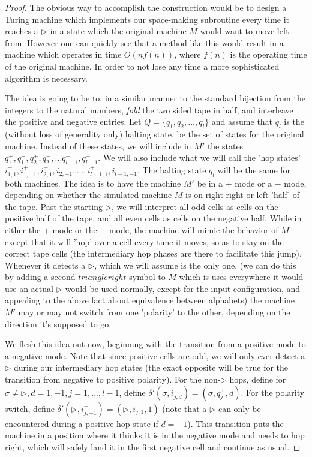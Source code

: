 \documentclass{article}
\theoremstyle{definition}
\theoremstyle{plain}
\theoremstyle{theorem}
\begin{document}
\begin{proof}
	The obvious way to accomplish the construction would be to design a Turing machine which implements our space-making subroutine every time it reaches a $\triangleright$ in a state which the original machine $M$ would want to move left from. However one can quickly see that a method like this would result in a machine which operates in time $O(nf(n))$, where $f(n)$ is the operating time of the original machine. In order to not lose any time a more sophisticated algorithm is necessary. \par 
	The idea is going to be to, in a similar manner to the standard bijection from the integers to the natural numbers, \textit{fold} the two sided tape in half, and interleave the positive and negative entries. Let $Q = \{q_1,q_2,...,q_l\}$ and assume that $q_l$ is the (without loss of generality only) halting state. be the set of states for the original machine. Instead of these states, we will include in $M'$ the states $q_1^+,q_1^-,q_2^+,q_2^-,...q_{l-1}^+,q_{l-1}^-$. We will also include what we will call the 'hop states' $i_{1,1}^+,i_{1,-1}^+,i_{2,1}^+,i_{2,-1}^-,...,i_{l-1,1}^+,i_{l-1,-1}^-$. The halting state $q_l$ will be the same for both machines. The idea is to have the machine $M'$ be in a $+$ mode or a $-$ mode, depending on whether the simulated machine $M$ is on right right or left 'half' of the tape. Past the starting $\triangleright$, we will interpret all odd cells as cells on the positive half of the tape, and all even cells as cells on the negative half. While in either the $+$ mode or the $-$ mode, the machine will mimic the behavior of $M$ except that it will 'hop' over a cell every time it moves, so as to stay on the correct tape cells (the intermediary hop phases are there to facilitate this jump). Whenever it detects a $\triangleright$, which we will assume is the only one, (we can do this by adding a second $\bar{triangleright}$ symbol to $M$ which is uses everywhere it would use an actual $\triangleright$ would be used normally, except for the input configuration, and appealing to the above fact about equivalence between alphabets) the machine $M'$ may or may not switch from one 'polarity' to the other, depending on the direction it's supposed to go. \par 
	We flesh this idea out now, beginning with the transition from a positive mode to a negative mode. Note that since positive cells are odd, we will only ever detect a $\triangleright$ during our intermediary hop states (the exact opposite will be true for the transition from negative to positive polarity). For the non-$\triangleright$ hops, define for $\sigma \neq \triangleright, d = 1,-1,j =1,...,l-1$, define $\delta'(\sigma,i_{j,d}^+) = (\sigma,q_j^+,d)$. For the polarity switch, define $\delta'(\triangleright,i_{j,-1}^+) = (\triangleright,i_{j,1}^-,1)$ (note that a $\triangleright$ can only be encountered during a positive hop state if $d=-1$). This transition puts the machine in a position where it thinks it is in the negative mode and needs to hop right, which will safely land it in the first negative cell and continue as usual. \par 

\end{proof}
\end{document}
